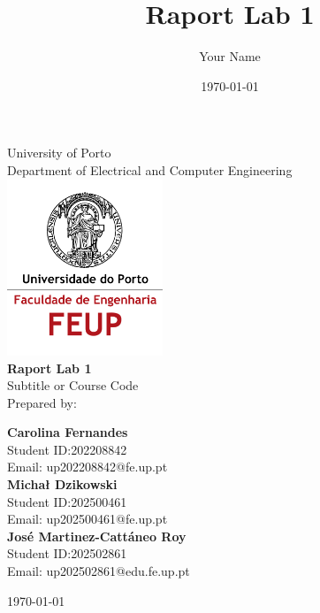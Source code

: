 \documentclass[12pt,a4paper]{report}
\title{Raport Lab 1}
\author{Your Name}
\date{\today}
\begin{document}
\begin{titlepage}
    \centering
    
    
    {\Large University of Porto}\\[0.5cm]
    
    {\large Department of Electrical and Computer Engineering}\\[1.5cm]
    
    \includegraphics[width=0.35\textwidth]{logo-feup.png}\\[0.7cm]
    
    {\huge \bfseries Raport Lab 1}\\[1cm]
    
    {\Large Subtitle or Course Code}\\[1.5cm]
    
        {\large Prepared by:}\\[0.5cm]
        \begin{flushleft}
            {\Large \textbf{Carolina Fernandes}} \\
            {\large Student ID:\@ 202208842} \\
            {\large Email: up202208842@fe.up.pt} \\
            \vspace{0.3cm}
            {\Large \textbf{Michał Dzikowski}} \\
            {\large Student ID:\@ 202500461} \\
            {\large Email: up202500461@fe.up.pt} \\
            \vspace{0.3cm}
            {\Large \textbf{José Martinez-Cattáneo Roy}} \\
            {\large Student ID:\@ 202502861} \\
            {\large Email: up202502861@edu.fe.up.pt}
        \end{flushleft}

    
    {\large \today}
    
    \vfill %
    
\end{titlepage}
\end{document}
